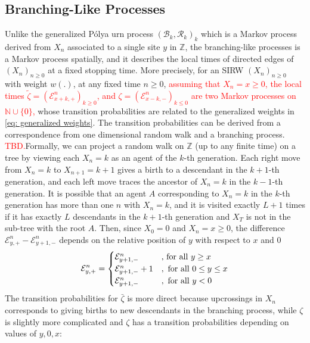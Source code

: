 \documentclass[twoside,12pt,a4paper]{article}
\numberwithin{equation}{section}
\newcommand\TBD{\textcolor{red}{TBD.}}
\newcommand{\edt}[1]{\textcolor{red}{#1}} %
\begin{document}
		\subsection{Branching-Like Processes}
		Unlike the generalized P\'{o}lya urn process $(\mathcal{B}_k,\mathcal{R}_k )_k$ which is a Markov process derived from $X_n$ associated to a single site $y$ in $\mathbb{Z}$, the branching-like processes is a Markov process spatially, and it describes the local times of directed edges of $(X_n)_{n\geq 0}$ at a fixed stopping time.
		More precisely, for an SIRW $(X_n)_{n\geq 0}$ with weight $w(.)$, at any fixed time $n \geq 0$, \edt{assuming that $X_n = x \geq 0 $, the local times $\tilde{\zeta}= \left(\mathcal{E}^{n}_{x+k,+} \right)_{k\geq 0}$, and ${\zeta}= \left(\mathcal{E}^{n}_{x-k,-} \right)_{k\leq 0}$ are two Markov processes on $\mathbb{N}\cup\{0\}$,} whose transition probabilities are related to the generalized weights in \eqref{eq: generalized weights}.
		The transition probabilities can be derived from a correspondence from one dimensional random walk and a branching process. \TBD Formally, we can project a random walk on $\mathbb{Z}$ (up to any finite time) on a tree by viewing each $X_n= k$ as an agent of the $k$-th generation. Each right move from $X_n=k$ to $X_{n+1}=k+1$ gives a birth to a descendant in the $k+1$-th generation, and each left move traces the ancestor of $X_n=k$ in the $k-1$-th generation.
		It is possible that an agent $A$ corresponding to $X_n=k$ in the $k$-th generation has more than one $n$ with $X_n=k$, and it is visited exactly $L+1$ times if it has exactly $L$ descendants in the $k+1$-th generation and $X_T $ is not in the sub-tree with the root $A$. 
		Then, since $X_0=0$ and $X_n =x \geq 0$, the difference $\mathcal{E}^n_{y,+} -\mathcal{E}^n_{y+1,-} $ depends on the relative position of $y$ with respect to $x$ and $0$ 
		\begin{equation}\label{eq: edge values}
			\mathcal{E}^n_{y,+} =\begin{cases}
				\mathcal{E}^n_{y+1,-} &\mbox{, for all $y\geq x$}\\
				\mathcal{E}^n_{y+1,-} +1 &,\mbox{ for all $0 \leq y\leq x$}
				\\
				\mathcal{E}^n_{y+1,-} &,\mbox{ for all $ y< 0 $}
			\end{cases}
		\end{equation}
		The transition probabilities for $\bar{\zeta}$ is more direct because upcrossings in $X_n$ corresponds to giving births to new descendants in the branching process, while $\zeta$ is slightly more complicated and $\zeta$ has a transition probabilities depending on values of $y,0,x$: 
\end{document}
